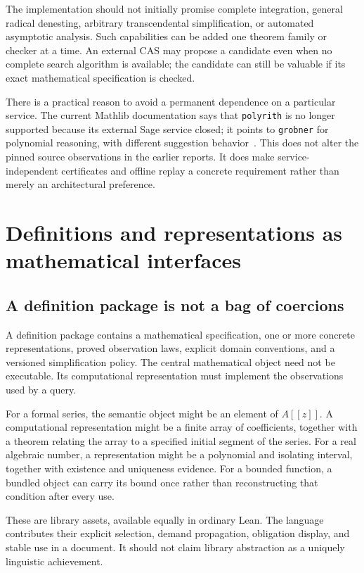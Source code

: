 \documentclass[11pt,a4paper]{article}
\newcommand{\code}[1]{\nolinkurl{#1}}
\theoremstyle{definition}
\begin{document}
The implementation should not initially promise complete integration, general radical denesting, arbitrary transcendental simplification, or automated asymptotic analysis. Such capabilities can be added one theorem family or checker at a time. An external CAS may propose a candidate even when no complete search algorithm is available; the candidate can still be valuable if its exact mathematical specification is checked.

There is a practical reason to avoid a permanent dependence on a particular service. The current Mathlib documentation says that \code{polyrith} is no longer supported because its external Sage service closed; it points to \code{grobner} for polynomial reasoning, with different suggestion behavior~\cite{polyrith}. This does not alter the pinned source observations in the earlier reports. It does make service-independent certificates and offline replay a concrete requirement rather than merely an architectural preference.

\section{Definitions and representations as mathematical interfaces}\label{sec:views}

\subsection{A definition package is not a bag of coercions}
A definition package contains a mathematical specification, one or more concrete representations, proved observation laws, explicit domain conventions, and a versioned simplification policy. The central mathematical object need not be executable. Its computational representation must implement the observations used by a query.

For a formal series, the semantic object might be an element of \(A[[z]]\). A computational representation might be a finite array of coefficients, together with a theorem relating the array to a specified initial segment of the series. For a real algebraic number, a representation might be a polynomial and isolating interval, together with existence and uniqueness evidence. For a bounded function, a bundled object can carry its bound once rather than reconstructing that condition after every use.

These are library assets, available equally in ordinary Lean. The language contributes their explicit selection, demand propagation, obligation display, and stable use in a document. It should not claim library abstraction as a uniquely linguistic achievement.
\end{document}
